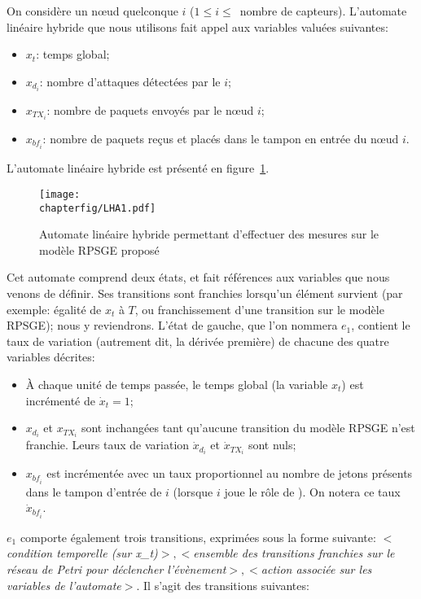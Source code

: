 On considère un nœud quelconque $i$ ($1\leq i\leq$~nombre de capteurs).
L'automate linéaire hybride que nous utilisons fait appel aux variables valuées suivantes:
\begin{itemize}
    \item $x_t$: temps global;
    \item $x_{d_i}$: nombre d'attaques détectées par le \cn $i$;
    \item $x_{\mathit{TX}_i}$: nombre de paquets envoyés par le nœud $i$;
    \item $x_{\mathit{bf}_i}$: nombre de paquets reçus et placés dans le tampon en entrée du nœud $i$.
\end{itemize}
L'automate linéaire hybride est présenté en figure~\ref{sa:fig:lha}.
\begin{figure}[H]
    \centering
    \texttt{[image: \\chapterfig/LHA1.pdf]}
    \caption{Automate linéaire hybride permettant d'effectuer des mesures sur le modèle RPSGE proposé}\label{sa:fig:lha}
\end{figure}
Cet automate comprend deux états, et fait références aux variables que nous venons de définir.
Ses transitions sont franchies lorsqu'un élément survient (par exemple: égalité de $x_t$ à $T$, ou franchissement d'une transition sur le modèle RPSGE); nous y reviendrons.
L'état de gauche, que l'on nommera $e_1$, contient le taux de variation (autrement dit, la dérivée première) de chacune des quatre variables décrites:
\begin{itemize}
    \item À chaque unité de temps passée, le temps global (la variable $x_t$) est incrémenté de $\dot{x}_t=1$;
    \item $x_{d_i}$ et $x_{\mathit{TX}_i}$ sont inchangées tant qu'aucune transition du modèle RPSGE n'est franchie.
        Leurs taux de variation $\dot{x}_{d_i}$ et $\dot{x}_{\mathit{TX}_i}$ sont nuls;
    \item $x_{\mathit{bf}_i}$ est incrémentée avec un taux proportionnel au nombre de jetons présents dans le tampon d'entrée de $i$ (lorsque $i$ joue le rôle de \cn).
        On notera ce taux $\dot{x}_{\mathit{bf}_i}$.
\end{itemize}
$e_1$ comporte également trois transitions, exprimées sous la forme suivante: $<$\textit{condition temporelle (sur x\_t)}$>, <$\textit{ensemble des transitions franchies sur le réseau de Petri pour déclencher l'évènement}$>, <$\textit{action associée sur les variables de l'automate}$>$.
Il s'agit des transitions suivantes:
